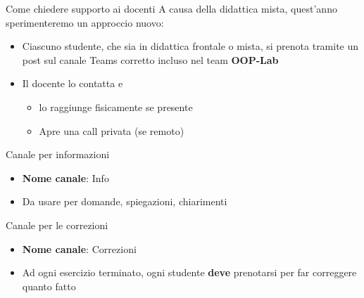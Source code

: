 \documentclass[presentation]{beamer}
\begin{document}
\begin{frame}{Come chiedere supporto ai docenti}
    A causa della didattica mista, quest'anno sperimenteremo un approccio nuovo:
    \begin{itemize}
        \item Ciascuno studente, che sia in didattica frontale o mista, si prenota tramite un post sul canale Teams corretto incluso nel team \textbf{OOP-Lab}
        \item Il docente lo contatta e
        \begin{itemize}
            \item lo raggiunge fisicamente se presente
            \item Apre una call privata (se remoto)
        \end{itemize}
    \end{itemize}
    \begin{block}{Canale per informazioni}
        \begin{itemize}
            \item \textbf{Nome canale}: Info
            \item Da usare per domande, spiegazioni, chiarimenti
        \end{itemize}
    \end{block}
    \begin{block}{Canale per le correzioni}
        \begin{itemize}
            \item \textbf{Nome canale}: Correzioni
            \item Ad ogni esercizio terminato, ogni studente \textbf{deve} prenotarsi per far correggere quanto fatto
        \end{itemize}
    \end{block}
\end{frame}
\end{document}
